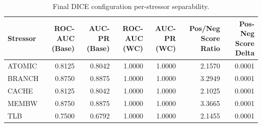 \begin{table}[t]
\centering
\caption{Final DICE configuration per-stressor separability.}
\label{tab:dice_full_stressor}
\footnotesize
\begin{tabular}{lrrrrrr}
\toprule
Stressor & ROC-AUC (Base) & AUC-PR (Base) & ROC-AUC (WC) & AUC-PR (WC) & Pos/Neg Score Ratio & Pos-Neg Score Delta \\
\midrule
ATOMIC & 0.8125 & 0.8042 & 1.0000 & 1.0000 & 2.1570 & 0.0001 \\
BRANCH & 0.8750 & 0.8875 & 1.0000 & 1.0000 & 3.2949 & 0.0001 \\
CACHE & 0.8125 & 0.8042 & 1.0000 & 1.0000 & 2.1025 & 0.0001 \\
MEMBW & 0.8750 & 0.8875 & 1.0000 & 1.0000 & 3.3665 & 0.0001 \\
TLB & 0.7500 & 0.6792 & 1.0000 & 1.0000 & 2.1455 & 0.0001 \\
\bottomrule
\end{tabular}

\end{table}
